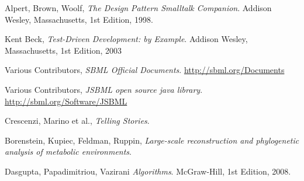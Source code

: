 \begin{thebibliography}{99}

  Alpert, Brown, Woolf,
  \emph{The Design Pattern Smalltalk Companion}.
  Addison Wesley, Massachusetts,
  1st Edition,
  1998.

  Kent Beck,
  \emph{Test-Driven Development: by Example}.
  Addison Wesley, Massachusetts,
  1st Edition,
  2003

  Various Contributors,
  \emph{SBML Official Documents}.
  \url{http://sbml.org/Documents}

 Various Contributors, \emph{JSBML open
    source java library}. \url{http://sbml.org/Software/JSBML}

  Crescenzi, Marino et al.,
  \emph{Telling Stories}.

 Borenstein, Kupiec, Feldman,
  Ruppin, \emph{Large-scale reconstruction and phylogenetic analysis
    of metabolic environments}.

  Dasgupta, Papadimitriou, Vazirani
  \emph{Algorithms}.
  McGraw-Hill,
  1st Edition,
  2008.


\end{thebibliography}